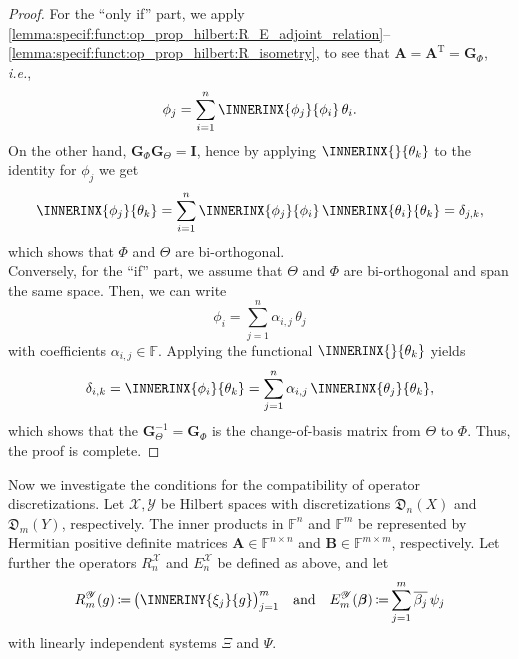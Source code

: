 \documentclass[a4paper]{paper}
\newcommand*{\SPC}[1]{{\ensuremath{\mathscr{#1}}}}
\newcommand*{\SPCX}{\SPC{X}}
\newcommand*{\SPCY}{\SPC{Y}}
\newcommand*{\FIELD}{{\ensuremath{\mathbb{F}}}}
\newcommand*{\Fn}{{\ensuremath{\FIELD^n}}}
\newcommand*{\Fm}{{\ensuremath{\FIELD^m}}}
\newcommand*{\Fnxn}{{\ensuremath{\FIELD^{n \times n}}}}
\newcommand*{\Fmxm}{{\ensuremath{\FIELD^{m \times m}}}}
\newcommand*{\EXT}[2]{\ensuremath{E_{#1}^{#2}}}
\newcommand*{\REST}[2]{\ensuremath{R_{#1}^{#2}}}
\newcommand*{\RnX}{{\ensuremath{\REST{n}{\SPC{X}}}}}
\newcommand*{\RmY}{{\ensuremath{\REST{m}{\SPC{Y}}}}}
\newcommand*{\EnX}{{\ensuremath{\EXT{n}{\SPC{X}}}}}
\newcommand*{\EmY}{{\ensuremath{\EXT{m}{\SPC{Y}}}}}
\newcommand*{\DISCR}[2]{{\ensuremath{\mathfrak{D}_{#1}(#2)}}}
\newcommand*{\DISCRnX}{\DISCR{n}{X}}
\newcommand*{\DISCRmY}{\DISCR{m}{Y}}
\DeclareMathOperator{\DEFEQ}{{\coloneqq}}
\newcommand*{\CCONJ}[1]{{\ensuremath{\overline{#1}}}}
\newcommand*{\TRANSP}[1]{{\ensuremath{#1^{\mathrm{T}}}}}
\newcommand*{\ie}{\textsl{i.e.}\xspace}
\newcommand*{\BDbeta}{\boldsymbol{\beta}}
\newcommand*{\BDA}{\boldsymbol{A}}
\newcommand*{\BDB}{\boldsymbol{B}}
\newcommand*{\BDG}{\boldsymbol{G}}
\newcommand*{\BDI}{\boldsymbol{I}}
\begin{document}
\begin{proof}
 For the ``only if'' part, we apply 
 \eqref{lemma:specif:funct:op_prop_hilbert:R_E_adjoint_relation}--\eqref{lemma:specif:funct:op_prop_hilbert:R_isometry},
 to see that $\BDA = \TRANSP{\BDA} = \BDG_\Phi$, \ie,
 \begin{equation*}
  \phi_j = \sum_{i=1}^n \INNERINX{\phi_j}{\phi_i}\, \theta_i.
 \end{equation*}
 On the other hand, $\BDG_\Phi \BDG_\Theta = \BDI$, hence by applying $\INNERINX{}{\theta_k}$ to the identity 
 for $\phi_j$ we get
 \begin{equation*}
  \INNERINX{\phi_j}{\theta_k} 
  = \sum_{i=1}^n \INNERINX{\phi_j}{\phi_i}\, \INNERINX{\theta_i}{\theta_k} = \delta_{j,k},
 \end{equation*}
 which shows that $\Phi$ and $\Theta$ are bi-orthogonal.\\
 Conversely, for the ``if'' part, we assume that $\Theta$ and $\Phi$ are bi-orthogonal and span the same space. Then, 
 we can write
 \begin{equation*}
  \phi_i = \sum_{j=1}^n \alpha_{i,j}\, \theta_j
 \end{equation*}
 with coefficients $\alpha_{i,j} \in \FIELD$. Applying the functional $\INNERINX{}{\theta_k}$ yields
 \begin{equation*}
  \delta_{i,k} = \INNERINX{\phi_i}{\theta_k} = \sum_{j=1}^n \alpha_{i,j}\, 
\INNERINX{\theta_j}{\theta_k},
 \end{equation*}
 which shows that the $\BDG_\Theta^{-1} = \BDG_\Phi$ is the change-of-basis matrix from $\Theta$ to $\Phi$. Thus, the
 proof is complete.
\end{proof}


Now we investigate the conditions for the compatibility of operator discretizations. Let $\SPCX, \SPCY$ be Hilbert 
spaces with discretizations $\DISCRnX$ and $\DISCRmY$, respectively. The inner products in 
$\Fn$ and $\Fm$ be represented by Hermitian positive definite matrices $\BDA \in \Fnxn$ and $\BDB 
\in \Fmxm$, respectively. 
Let further the operators $\RnX$ and $\EnX$ be defined as above, and let
%
\begin{equation*}
 \RmY(g) \DEFEQ  \big( \INNERINY{\xi_j}{g} \big)_{j=1}^m
 \quad \text{and} \quad
 \EmY(\BDbeta) \DEFEQ  \sum_{j=1}^m \CCONJ{\beta_j}\, \psi_j
\end{equation*}
%
with linearly independent systems $\Xi$ and $\Psi$.
\end{document}
